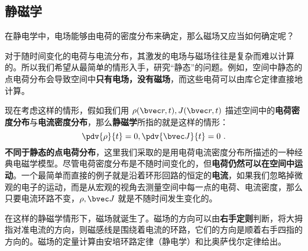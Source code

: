 \subsection{静磁学}
在静电学中，电场能够由电荷的密度分布来确定，那么磁场又应当如何确定呢？

对于随时间变化的电荷与电流分布，其激发的电场与磁场往往是复杂而难以计算的。所以我们希望从最简单的情形入手，研究“静态”的问题。例如，空间中静态的点电荷分布会导致空间中\textbf{只有电场，没有磁场}，而这些电荷可以由库仑定律直接地计算。

现在考虑这样的情形，假如我们用 $\rho(\bvec r,t),J(\bvec r,t)$ 描述空间中的\textbf{电荷密度分布}与\textbf{电流密度分布}，那么\textbf{静磁学}所指的就是这样的情形：
\begin{equation}
\pdv{\rho}{t}=0,\pdv{\bvec J}{t}=0~.
\end{equation}
\textbf{不同于静态的点电荷分布}，这里我们采取的是用电荷电流密度分布所描述的一种经典电磁学模型。尽管电荷密度分布是不随时间变化的，但\textbf{电荷仍然可以在空间中运动}。一个最简单而直接的例子就是沿着环形回路的恒定的\textbf{电流}，如果我们忽略掉微观的电子的运动，而是从宏观的视角去测量空间中每一点的电荷、电流密度，那么只要电流环路不变，$\rho,\bvec J$ 就是不随时间发生变化的。

在这样的静磁学情形下，磁场就诞生了。磁场的方向可以由\textbf{右手定则}判断，将大拇指对准电流的方向，则磁感线是围绕着电流的环路，它们的方向是顺着右手四指的方向的。磁场的定量计算由安培环路定律（静电学）和比奥萨伐尔定律给出。